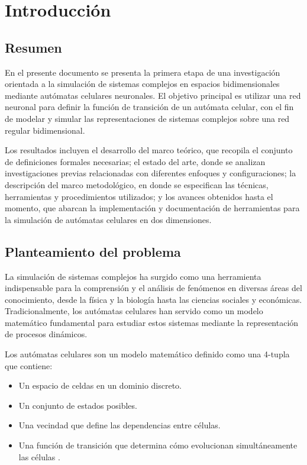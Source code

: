 \chapter{Introducción}

\section{Resumen}

En el presente documento se presenta la primera etapa de una investigación orientada a la simulación de sistemas complejos en espacios bidimensionales mediante autómatas celulares neuronales. El objetivo principal es utilizar una red neuronal para definir la función de transición de un autómata celular, con el fin de modelar y simular las representaciones de sistemas complejos sobre una red regular bidimensional.

Los resultados incluyen el desarrollo del marco teórico, que recopila el conjunto de definiciones formales necesarias; el estado del arte, donde se analizan investigaciones previas relacionadas con diferentes enfoques y configuraciones; la descripción del marco metodológico, en donde se especifican las técnicas, herramientas y procedimientos utilizados; y los avances obtenidos hasta el momento, que abarcan la implementación y documentación de herramientas para la simulación de autómatas celulares en dos dimensiones.

\section{Planteamiento del problema}

La simulación de sistemas complejos ha surgido como una herramienta indispensable para la comprensión y el análisis de fenómenos en diversas áreas del conocimiento, desde la física y la biología hasta las ciencias sociales y económicas. Tradicionalmente, los autómatas celulares han servido como un modelo matemático fundamental para estudiar estos sistemas mediante la representación de procesos dinámicos. 

Los autómatas celulares son un modelo matemático definido como una 4-tupla que contiene: 

\begin{itemize}
	
	\item Un espacio de celdas en un dominio discreto.
	
	\item Un conjunto de estados posibles.
	
	\item Una vecindad que define las dependencias entre células.
	
	\item Una función de transición que determina cómo evolucionan simultáneamente las células \cite{wolframCA, ZenilMartinez2024}. 
	
\end{itemize}

